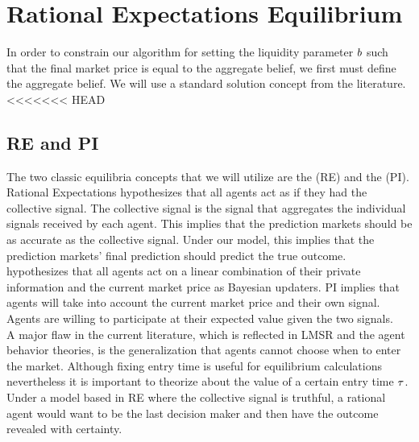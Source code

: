 \section{Rational Expectations Equilibrium}
In order to constrain our algorithm for setting the liquidity parameter $b$ such that the final market price is equal to the aggregate belief, we first must define the aggregate belief. We will use a standard solution concept from the literature.\\

<<<<<<< HEAD
\subsection{RE and PI}
The two classic equilibria concepts that we will utilize are the  (RE) and the  (PI). Rational Expectations hypothesizes that all agents act as if they had the collective signal. The collective signal is the signal that aggregates the individual signals received by each agent. This implies that the prediction markets should be as accurate as the collective signal. Under our model, this implies that the prediction markets' final prediction should predict the true outcome. \\

 hypothesizes that all agents act on a linear combination of their private information and the current market price as Bayesian updaters. PI implies that agents will take into account the current market price and their own signal. Agents are willing to participate at their expected value given the two signals. \\

A major flaw in the current literature, which is reflected in LMSR and the agent behavior theories, is the generalization that agents cannot choose when to enter the market. Although fixing entry time is useful for equilibrium calculations nevertheless it is important to theorize about the value of a certain entry time $\tau$. Under a model based in RE where the collective signal is truthful, a rational agent would want to be the last decision maker and then have the outcome revealed with certainty.\\


